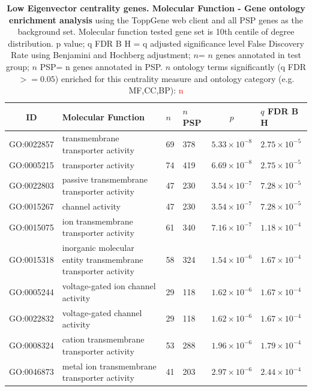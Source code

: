  \begin{table}[ht]
\centering
\begin{adjustbox}{width=\textwidth}
\setlength{\extrarowheight}{2pt}
\begin{tabular}{@{}clllcl@{}}
  \toprule
  ID & Molecular Function & $n$ & $n$ PSP & $p$ & $q$ FDR B H \\ 

  \midrule
GO:0022857 & transmembrane transporter activity & 69 & 378 & $5.33 \times 10^{-8}$ & $2.75 \times 10^{-5}$ \\ 
  GO:0005215 & transporter activity & 74 & 419 & $6.69 \times 10^{-8}$ & $2.75 \times 10^{-5}$ \\ 
  GO:0022803 & passive transmembrane transporter activity & 47 & 230 & $3.54 \times 10^{-7}$ & $7.28 \times 10^{-5}$ \\ 
  GO:0015267 & channel activity & 47 & 230 & $3.54 \times 10^{-7}$ & $7.28 \times 10^{-5}$ \\ 
  GO:0015075 & ion transmembrane transporter activity & 61 & 340 & $7.16 \times 10^{-7}$ & $1.18 \times 10^{-4}$ \\ 
  GO:0015318 & inorganic molecular entity transmembrane transporter activity & 58 & 324 & $1.54 \times 10^{-6}$ & $1.67 \times 10^{-4}$ \\ 
  GO:0005244 & voltage-gated ion channel activity & 29 & 118 & $1.62 \times 10^{-6}$ & $1.67 \times 10^{-4}$ \\ 
  GO:0022832 & voltage-gated channel activity & 29 & 118 & $1.62 \times 10^{-6}$ & $1.67 \times 10^{-4}$ \\ 
  GO:0008324 & cation transmembrane transporter activity & 53 & 288 & $1.96 \times 10^{-6}$ & $1.79 \times 10^{-4}$ \\ 
  GO:0046873 & metal ion transmembrane transporter activity & 41 & 203 & $2.97 \times 10^{-6}$ & $2.44 \times 10^{-4}$ \\ 
   \bottomrule
\end{tabular}
\end{adjustbox}
\caption[Gene ontology enrichment Low Eigenvector centrality genes Molecular Function of genes above 10th centile of distribution]{\textbf{Low Eigenvector centrality genes. Molecular Function - Gene ontology enrichment analysis} using the ToppGene web client and all PSP genes as the background set.  Molecular function tested gene set is 10th centile of degree distribution.  p value; q FDR B H = q adjusted significance level False Discovery Rate using Benjamini and Hochberg adjustment; $n$= $n$ genes annotated in test group; $n$ PSP= n genes annotated in PSP. $n$ ontology terms significantly (q FDR$>=0.05$) enriched for this centrality measure and ontology category (e.g. MF,CC,BP): \textcolor{red}{n}} 

\label{tab:ToppGENE GO: Molecular Function. 10 centile cw psp eig.txtp = p value; q FDR B H = q adjusted significance level False Discovery Rate using Benjamini and Hochberg adjustment; n= n genes annotated in test group; n PSP= n genes annotated in PSP}
\end{table}

